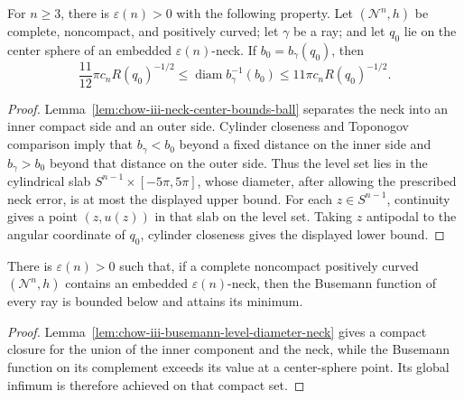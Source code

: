 \begin{lemma}
\label{lem:chow-iii-busemann-level-diameter-neck}
For \(n\ge3\), there is \(\varepsilon(n)>0\) with the following property.
Let \((\mathcal N^n,h)\) be complete, noncompact, and positively curved; let
\(\gamma\) be a ray; and let \(q_0\) lie on the center sphere of an embedded
\(\varepsilon(n)\)-neck.  If \(b_0=b_\gamma(q_0)\), then
\[
 \frac{11}{12}\pi c_nR(q_0)^{-1/2}
 \le\operatorname{diam}b_\gamma^{-1}(b_0)
 \le11\pi c_nR(q_0)^{-1/2}.
\]
\end{lemma}
\begin{proof}
\sketch Lemma~\ref{lem:chow-iii-neck-center-bounds-ball} separates the neck into an
inner compact side and an outer side.  Cylinder closeness and Toponogov
comparison imply that \(b_\gamma<b_0\) beyond a fixed distance on the inner
side and \(b_\gamma>b_0\) beyond that distance on the outer side.  Thus the
level set lies in the cylindrical slab \(S^{n-1}\times[-5\pi,5\pi]\), whose
diameter, after allowing the prescribed neck error, is at most the displayed
upper bound.  For each \(z\in S^{n-1}\), continuity gives a point
\((z,u(z))\) in that slab on the level set.  Taking \(z\) antipodal to the
angular coordinate of \(q_0\), cylinder closeness gives the displayed lower
bound.
\end{proof}

\begin{lemma}
\label{lem:chow-iii-busemann-attains-minimum}
There is \(\varepsilon(n)>0\) such that, if a complete noncompact positively
curved \((\mathcal N^n,h)\) contains an embedded \(\varepsilon(n)\)-neck,
then the Busemann function of every ray is bounded below and attains its
minimum.
\end{lemma}
\begin{proof}
\sketch Lemma~\ref{lem:chow-iii-busemann-level-diameter-neck} gives a compact
closure for the union of the inner component and the neck, while the Busemann
function on its complement exceeds its value at a center-sphere point.  Its
global infimum is therefore achieved on that compact set.
\end{proof}


